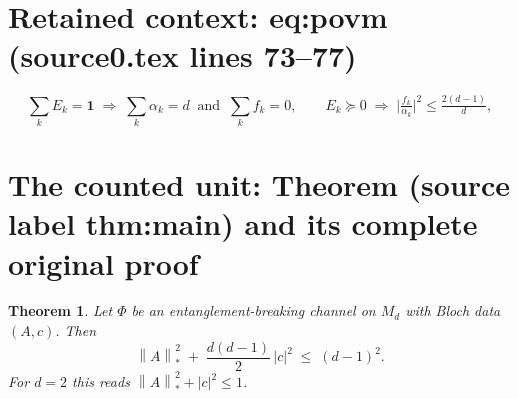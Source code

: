 \documentclass[10pt,a4paper]{amsart}
\newcommand{\I}{\mathbf{1}}
\newcommand{\nuc}[1]{\left\lVert #1 \right\rVert_{*}}
\theoremstyle{plain}
\newtheorem{theorem}{Theorem}
\theoremstyle{remark}
\begin{document}
\section*{Retained context: eq:povm (source0.tex lines 73--77)}

\begin{equation}\label{eq:povm}
\sum_k E_k=\I \;\Longrightarrow\; \sum_k\alpha_k=d \ \text{ and }\ \sum_k f_k=0,
\qquad
E_k\succeq0 \;\Longrightarrow\; \Big|\tfrac{f_k}{\alpha_k}\Big|^2 \le \tfrac{2(d-1)}{d},
\end{equation}


\section{The counted unit: Theorem (source label thm:main) and its complete original proof}

\begin{theorem}\label{thm:main}
Let $\Phi$ be an entanglement-breaking channel on $M_d$ with Bloch data $(A,c)$. Then
\[
\nuc{A}^2 \;+\; \frac{d(d-1)}{2}\,|c|^2 \;\le\; (d-1)^2 .
\]
For $d=2$ this reads $\nuc{A}^2+|c|^2\le1$.
\end{theorem}
\end{document}
